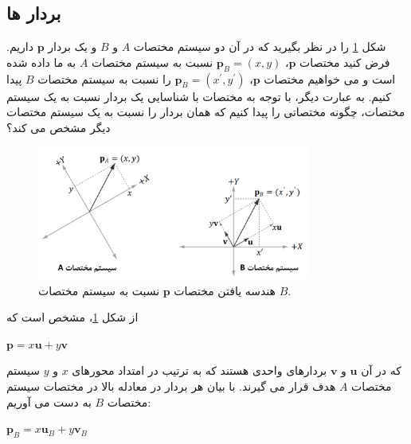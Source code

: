 \subsection{\textbf{بردار ها}}
\label{subsec:3.4.1}
{
    \Large
    \begin{spacing}{1.5}
        شکل \ref{fig:4.Session.1.3.11} را در نظر بگیرید که در آن دو سیستم مختصات $A$ و $B$ و یک بردار $\textbf{p}$ داریم.
        فرض کنید مختصات $\textbf{p}$، $\textbf{p}_{B}=(x, y)$ نسبت به سیستم مختصات $A$ به ما داده شده است
        و می خواهیم مختصات $\textbf{p}$، $\textbf{p}_{B}=(x^\prime, y^\prime)$ را نسبت به سیستم مختصات $B$ پیدا کنیم.
        به عبارت دیگر، با توجه به مختصات با شناسایی یک بردار نسبت به یک سیستم مختصات، چگونه مختصاتی را پیدا کنیم که همان بردار را نسبت به یک سیستم مختصات دیگر مشخص می کند؟

        \begin{figure}[H]
            \centering
            \setlength{\belowcaptionskip}{-10pt}
            \includegraphics[width=0.8\textwidth]{Images/4/3/4.Session.1.3.11}
            \caption {هندسه یافتن مختصات $\textbf{p}$ نسبت به سیستم مختصات $B$.}
            \label{fig:4.Session.1.3.11}
        \end{figure}

        از شکل \ref{fig:4.Session.1.3.11}، مشخص است که

        \begin{center}
            $\textbf{p}=x\textbf{u}+y\textbf{v}$
        \end{center}

        که در آن $\textbf{u}$ و $\textbf{v}$ بردارهای واحدی هستند که به ترتیب در امتداد محورهای $x$ و $y$ سیستم مختصات $A$ هدف قرار می گیرند.
        با بیان هر بردار در معادله بالا در مختصات سیستم مختصات $B$ به دست می آوریم:

        \begin{center}
            $\textbf{p}_{B}=x\textbf{u}_{B}+y\textbf{v}_{B}$
        \end{center}


\end{spacing}}
